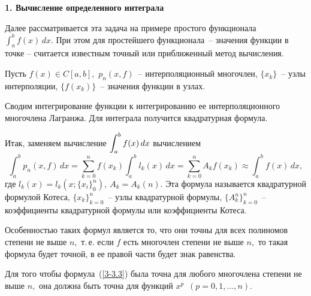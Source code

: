 \vspace{3mm}
{\bf 1. Вычисление определенного интеграла}
\vspace{3mm}

Далее рассматривается эта задача на примере простого функционала
$\displaystyle\int_a^b f(x)\,dx.$ При этом для простейшего функционала~-- значения функции в
точке -- считается
известным точный или приближенный метод вычисления.




Пусть $f(x)\in C[a,b],$ $p_n(x,f)$~-- интерполяционный многочлен, $\{x_k\}$~--
узлы интерполяции, $\{f(x_k)\}$~-- значения функции в узлах.

Сводим интегрирование функции к интегрированию ее интерполяционного многочлена Лагранжа.
Для интеграла получится квадратурная формула.

Итак, заменяем вычисление $\displaystyle\int_a^b f(x)\,dx$ вычислением
\begin{equation}\label{3-3.3}
  \int_a^b p_n(x,f)\,dx=\sum\limits_{k=0}^n f(x_k)\int_a^b l_k(x)\,dx=
  \sum\limits_{k=0}^n A_k f(x_k) \approx \int_a^b
  f(x)\,dx,
\end{equation}
где $l_k(x)=l_k(x;\{x_i\}_0^n),\ A_k=A_k(n).$
Эта формула называется квадратурной формулой {Котеса}, $\{x_k\}^n_{k=0}$~-- узлы
квадратурной формулы, $\{A_k^n\}^n_{k=0}$~-- коэффициенты квадратурной формулы или
коэффициенты Котеса.

Особенностью таких формул является то, что они точны для всех полиномов степени не выше $n,$
т.\,е. если $f$ есть многочлен степени не выше $n,$ то такая формула будет
точной, в {ее правой части} будет знак равенства.

Для того чтобы формула~(\ref{3-3.3})
была точна для любого многочлена степени не выше $n,$ она
должна быть точна для функций $x^p$\ $(p=0,1,\dots ,n).$

